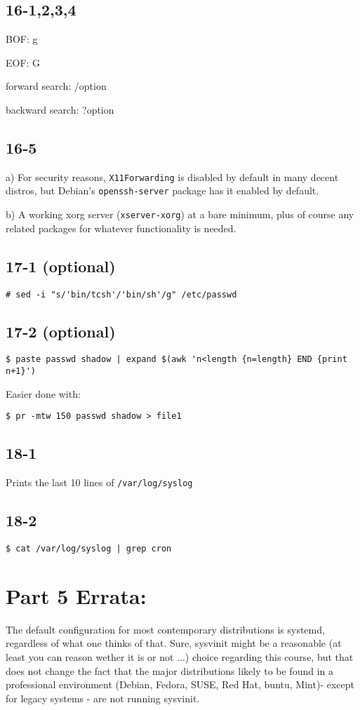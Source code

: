 \subsection{16-1,2,3,4}
BOF: g

EOF: G

forward search: /option

backward search: ?option

\subsection{16-5}
a) For security reasons, \verb=X11Forwarding= is disabled by default in many decent distros, but Debian's \verb=openssh-server= package has it enabled by default.

b) A working xorg server (\verb=xserver-xorg=) at a bare minimum, plus of course any related packages for whatever functionality is needed.

\subsection{17-1 (optional)}
\verb=# sed -i "s/'bin/tcsh'/'bin/sh'/g" /etc/passwd=

\subsection{17-2 (optional)}
\begin{verbatim}$ paste passwd shadow | expand $(awk 'n<length {n=length} END {print n+1}')\end{verbatim}

Easier done with:

\verb=$ pr -mtw 150 passwd shadow > file1=

\subsection{18-1}
Prints the last 10 lines of \verb=/var/log/syslog=

\subsection{18-2}
\verb=$ cat /var/log/syslog | grep cron=


\section{Part 5 Errata:}
The default configuration for most contemporary distributions is systemd, regardless of what one thinks of that. Sure, sysvinit might be a reasonable (at least you can reason wether it is or not ...) choice regarding this course, but that does not change the fact that the major distributions likely to be found in a professional environment (Debian, Fedora, SUSE, Red Hat, \*buntu, Mint)- except for legacy systems - are not running sysvinit.

